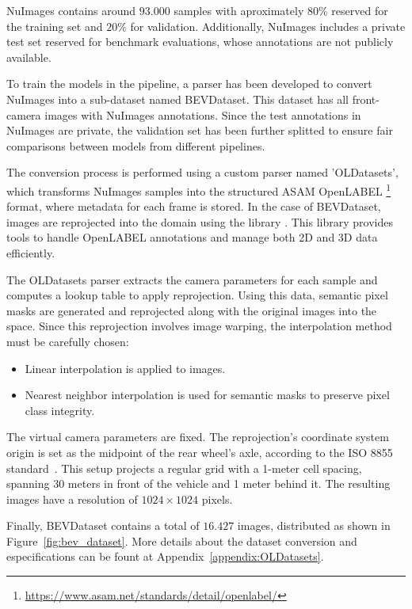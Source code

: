 NuImages contains around $93.000$ samples with aproximately $80\%$ reserved for the training set and $20\%$ for validation. Additionally, NuImages includes a private test set reserved for benchmark evaluations, whose annotations are not publicly available.

To train the models in the pipeline, a parser has been developed to convert NuImages into a sub-dataset named BEVDataset. This dataset has all front-camera images with NuImages annotations. Since the test annotations in NuImages are private, the validation set has been further splitted to ensure fair comparisons between models from different pipelines.

The conversion process is performed using a custom parser named 'OLDatasets', which transforms NuImages samples into the structured ASAM OpenLABEL \footnote{\url{https://www.asam.net/standards/detail/openlabel/}} format, where metadata for each frame is stored. In the case of BEVDataset, images are reprojected into the  domain using the  library \cite{VCD}. This library provides tools to handle OpenLABEL annotations and manage both 2D and 3D data efficiently.

The OLDatasets parser extracts the camera parameters for each sample and computes a lookup table to apply  reprojection. Using this data, semantic pixel masks are generated and reprojected along with the original images into the  space. Since this reprojection involves image warping, the interpolation method must be carefully chosen:
\begin{itemize}
    \item Linear interpolation is applied to images.
    \item Nearest neighbor interpolation is used for semantic masks to preserve pixel class integrity. 
\end{itemize}

The virtual  camera parameters are fixed. The reprojection's coordinate system origin is set as the midpoint of the rear wheel's axle, according to the ISO 8855 standard~\cite{ISO8855}. This setup projects a regular grid with a 1-meter cell spacing, spanning 30 meters in front of the vehicle and 1 meter behind it. The resulting images have a resolution of $1024 \times 1024$ pixels.

Finally, BEVDataset contains a total of $16.427$ images, distributed as shown in Figure~\ref{fig:bev_dataset}. More details about the dataset conversion and especifications can be fount at Appendix~\ref{appendix:OLDatasets}.


